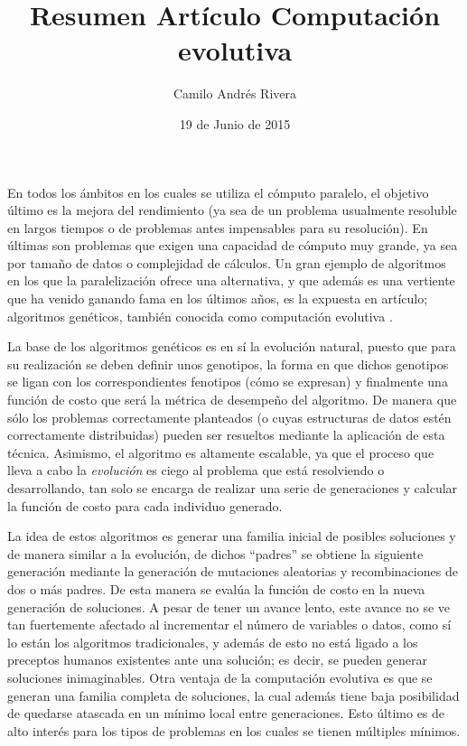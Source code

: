 \documentclass{article}
\title{Resumen Artículo Computación evolutiva}
\author{Camilo Andrés Rivera}
\date{19 de Junio de 2015}
\begin{document}
\maketitle

En todos los ámbitos en los cuales se utiliza el cómputo paralelo, el objetivo último es la mejora del rendimiento (ya sea de un problema usualmente resoluble en largos tiempos o de problemas antes impensables para su resolución). En últimas son problemas que exigen una capacidad de cómputo muy grande, ya sea por tamaño de datos o complejidad de cálculos. Un gran ejemplo de algoritmos en los que la paralelización ofrece una alternativa, y que además es una vertiente que ha venido ganando fama en los últimos años, es la expuesta en artículo; algoritmos genéticos, también conocida como computación evolutiva \cite{elart}.

La base de los algoritmos genéticos es en sí la evolución natural, puesto que para su realización se deben definir unos genotipos, la forma en que dichos genotipos se ligan con los correspondientes fenotipos (cómo se expresan) y finalmente una función de costo que será la métrica de desempeño del algoritmo. De manera que sólo los problemas correctamente planteados (o cuyas estructuras de datos estén correctamente distribuidas) pueden ser resueltos mediante la aplicación de esta técnica. Asimismo, el algoritmo es altamente escalable, ya que el proceso que lleva a cabo la \textit{evolución} es ciego al problema que está resolviendo o desarrollando, tan solo se encarga de realizar una serie de generaciones y calcular la función de costo para cada individuo generado.

La idea de estos algoritmos es generar una familia inicial de posibles soluciones y de manera similar a la evolución, de dichos ``padres'' se obtiene la siguiente generación mediante la generación de mutaciones aleatorias y recombinaciones de dos o más padres. De esta manera se evalúa la función de costo en la nueva generación de soluciones. A pesar de tener un avance lento, este avance no se ve tan fuertemente afectado al incrementar el número de variables o datos, como sí lo están los algoritmos tradicionales, y además de esto no está ligado a los preceptos humanos existentes ante una solución; es decir, se pueden generar soluciones inimaginables. Otra ventaja de la computación evolutiva es que se generan una familia completa de soluciones, la cual además tiene baja posibilidad de quedarse atascada en un mínimo local entre generaciones. Esto último es de alto interés para los tipos de problemas en los cuales se tienen múltiples mínimos.
\end{document}
